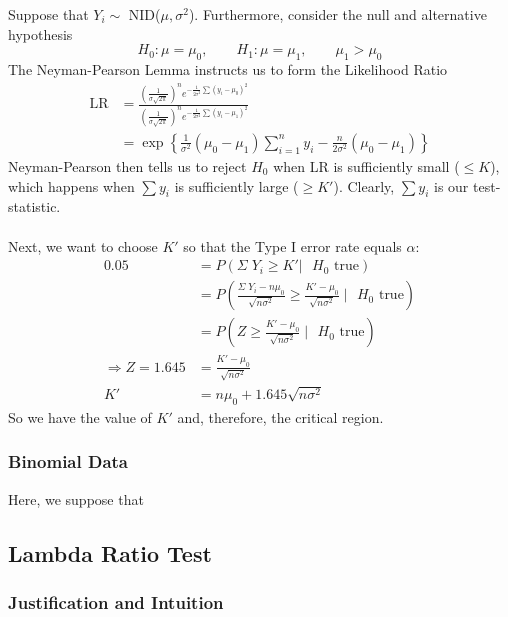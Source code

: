 \documentclass[a4paper,12pt]{scrartcl}
\begin{document}
Suppose that $Y_i \sim$ NID($\mu, \sigma^2$). Furthermore, consider
the null and alternative hypothesis
   \[ H_0: \mu = \mu_0, \qquad H_1: \mu = \mu_1, \qquad \mu_1 > \mu_0 \]
The Neyman-Pearson Lemma instructs us to form the Likelihood Ratio
\begin{align*}
   \text{LR} &= \frac{ \left(\frac{1}{\sigma \sqrt{2\pi}}\right)^n
      e^{-\frac{1}{2\sigma^2} \sum (y_i - \mu_0)^2}}{
      \left(\frac{1}{\sigma \sqrt{2\pi}}\right)^n
      e^{-\frac{1}{2\sigma^2} \sum (y_i - \mu_1)^2}}\\
   &= \exp\left\{\frac{1}{\sigma^2}(\mu_0 - \mu_1) \sum^n_{i=1} y_i -
	 \frac{n}{2\sigma^2}\left(
      \mu_0 - \mu_1\right)\right\}
\end{align*}
Neyman-Pearson then
tells us to reject $H_0$ when LR is sufficiently small
($\leq K$), which happens when $\sum y_i$ is sufficiently large
($\geq K'$). Clearly, $\sum y_i$ is our test-statistic.
\\
\\
Next, we want to choose $K'$ so that the Type I error rate equals
$\alpha$:
\begin{align*}
   0.05 &= P(\Sigma\; Y_i \geq K' | \text{ $H_0$ true}) \\
   &= P\left( \frac{ \Sigma \; Y_i - n \mu_0}{\sqrt{n\sigma^2}}
      \geq \frac{K' - \mu_0}{\sqrt{n\sigma^2}} \; \rvert
      \text{ $H_0$ true}\right) \\
   &= P\left( Z \geq \frac{K' - \mu_0}{\sqrt{n\sigma^2}} \; \rvert
      \text{ $H_0$ true}\right) \\
   \Rightarrow Z = 1.645 &= \frac{K' - \mu_0}{\sqrt{n\sigma^2}} \\
   K' &= n\mu_0 + 1.645 \sqrt{n\sigma^2}
\end{align*}
So we have the value of $K'$ and, therefore, the critical region.

\newpage
\subsubsection{Binomial Data}

Here, we suppose that

\newpage
\subsection{Lambda Ratio Test}

\subsubsection{Justification and Intuition}
\end{document}
